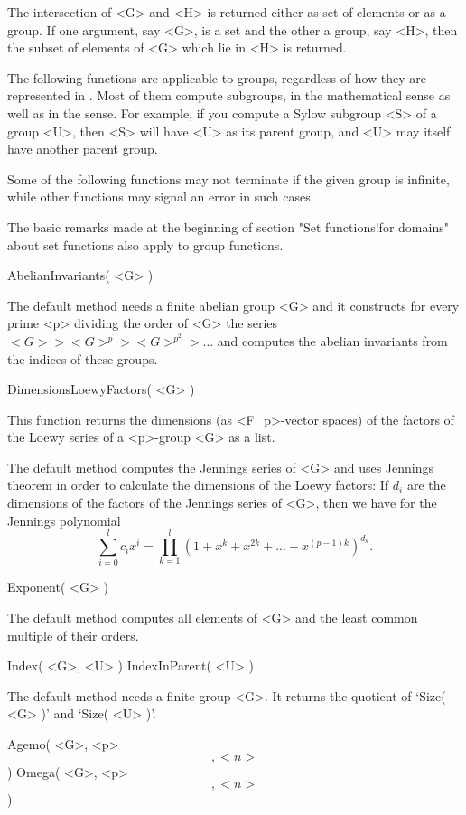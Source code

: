 The intersection of <G> and <H> is returned either  as set of elements or
as a group. If one argument, say <G>, is a set and the other a group, say
<H>, then the subset of elements of <G> which lie in <H> is returned.


The following functions are applicable to  groups, regardless of how they
are  represented in   {\GAP}.  Most of  them  compute  subgroups, in  the
mathematical sense as well  as in the  {\GAP} sense. For example,  if you
compute a Sylow subgroup  <S> of a group <U>,  then <S> will have  <U> as
its parent group, and <U> may itself have another parent group.

Some of the  following functions may not  terminate if the given group is
infinite, while other functions may signal an error in such cases.

The basic remarks  made at the beginning   of section "Set  functions!for
domains" about set functions also apply to group functions.

\>AbelianInvariants( <G> )

The default method needs a finite abelian group <G> and it constructs for
every  prime  <p> dividing the  order  of <G>  the series $<G>  > <G>^p >
<G>^{p^2} > \ldots$ and computes the abelian  invariants from the indices
of these groups.

\>DimensionsLoewyFactors( <G> )

This  function returns the dimensions   (as  <F_p>-vector spaces) of  the
factors of the Loewy series of a <p>-group <G> as a list.

The default method computes the Jennings series  of <G> and uses Jennings
theorem  in order to  calculate the dimensions  of  the Loewy factors: If
$d_i$  are the dimensions  of the factors of  the Jennings series of <G>,
then we have for the Jennings polynomial
$$ \sum_{i=0}^l c_i x^i =
   \prod_{k=1}^l (1+x^k+x^{2k}+...+x^{(p-1)k})^{d_k}. $$

\>Exponent( <G> )

The  default method computes  all elements  of  <G> and  the least common
multiple of their orders.

\>Index( <G>, <U> )
\>IndexInParent( <U> )

The default method needs  a finite group <G>.  It returns the quotient of
`Size( <G> )' and `Size( <U> )'.

\>Agemo( <G>, <p> \[, <n> \] )
\>Omega( <G>, <p> \[, <n> \] )

